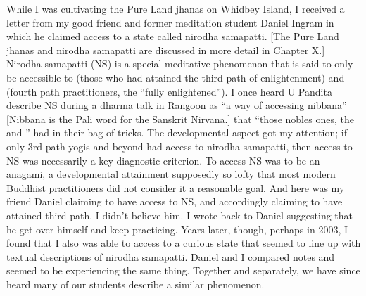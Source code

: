 \documentclass[a5paper,10pt,english]{book}
\begin{document}
\sphinxAtStartPar
While I was cultivating the Pure Land jhanas on Whidbey Island, I
received a letter from my good friend and former meditation student
Daniel Ingram in which he claimed access to a state called nirodha
samapatti. {[}The Pure Land jhanas and nirodha samapatti are discussed in
more detail in Chapter X.{]} Nirodha samapatti (NS) is a special
meditative phenomenon that is said to only be accessible to 
(those who had attained the third path of enlightenment) and 
(fourth path practitioners, the “fully enlightened”). I once heard U
Pandita describe NS during a dharma talk in Rangoon as “a way of
accessing nibbana” {[}Nibbana is the Pali word for the Sanskrit Nirvana.{]}
that “those nobles ones, the  and ” had in their
bag of tricks. The developmental aspect got my attention; if only 3rd
path yogis and beyond had access to nirodha samapatti, then access to NS
was necessarily a key diagnostic criterion. To access NS was to be an
anagami, a developmental attainment supposedly so lofty that most modern
Buddhist practitioners did not consider it a reasonable goal. And here
was my friend Daniel claiming to have access to NS, and accordingly
claiming to have attained third path. I didn’t believe him. I wrote back
to Daniel suggesting that he get over himself and keep practicing. Years
later, though, perhaps in 2003, I found that I also was able to access
to a curious state that seemed to line up with textual descriptions of
nirodha samapatti. Daniel and I compared notes and seemed to be
experiencing the same thing. Together and separately, we have since
heard many of our students describe a similar phenomenon.
\end{document}
